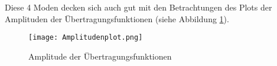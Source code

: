     \noindent
    Diese 4 Moden decken sich auch gut mit den Betrachtungen des Plots der
    Amplituden der Übertragungsfunktionen (siehe Abbildung
    \ref{fig: Amplitudenplot}).

    \begin{figure}[H]
        \centering
        \texttt{[image: Amplitudenplot.png]}
        \caption{Amplitude der Übertragungsfunktionen}
        \label{fig: Amplitudenplot}
    \end{figure}